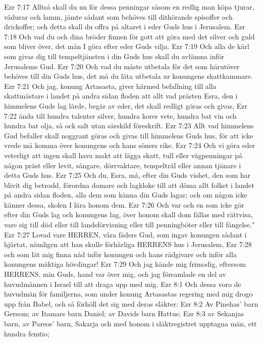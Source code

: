 Ezr 7:17  Alltså skall du nu för dessa penningar såsom en redlig man köpa tjurar, vädurar och lamm, jämte sådant som behöves till dithörande spisoffer och drickoffer; och detta skall du offra på altaret i eder Guds hus i Jerusalem.
Ezr 7:18  Och vad du och dina bröder finnen för gott att göra med det silver och guld som bliver över, det mån I göra efter eder Guds vilja.
Ezr 7:19  Och alla de kärl som givas dig till tempeltjänsten i din Guds hus skall du avlämna inför Jerusalems Gud.
Ezr 7:20  Och vad du måste utbetala för det som härutöver behöves till din Guds hus, det må du låta utbetala ur konungens skattkammare.
Ezr 7:21  Och jag, konung Artasasta, giver härmed befallning till alla skattmästare i landet på andra sidan floden att allt vad prästen Esra, den i himmelens Guds lag lärde, begär av eder, det skall redligt göras och givas,
Ezr 7:22  ända till hundra talenter silver, hundra korer vete, hundra bat vin och hundra bat olja, så ock salt utan särskild föreskrift.
Ezr 7:23  Allt vad himmelens Gud befaller skall noggrant göras och givas till himmelens Guds hus, för att icke vrede må komma över konungens och hans söners rike.
Ezr 7:24  Och vi göra eder veterligt att ingen skall hava makt att lägga skatt, tull eller vägpenningar på någon präst eller levit, sångare, dörrvaktare, tempelträl eller annan tjänare i detta Guds hus.
Ezr 7:25  Och du, Esra, må, efter din Guds vishet, den som har blivit dig betrodd, förordna domare och lagkloke till att döma allt folket i landet på andra sidan floden, alla dem som känna din Guds lagar; och om någon icke känner dessa, skolen I lära honom dem.
Ezr 7:26  Och var och en som icke gör efter din Guds lag och konungens lag, över honom skall dom fällas med rättvisa, vare sig till död eller till landsförvisning eller till penningböter eller till fängelse."
Ezr 7:27  Lovad vare HERREN, våra fäders Gud, som ingav konungen sådant i hjärtat, nämligen att han skulle förhärliga HERRENS hus i Jerusalem,
Ezr 7:28  och som lät mig finna nåd inför konungen och hans rådgivare och inför alla konungens mäktiga hövdingar!
Ezr 7:29  Och jag kände mig frimodig, eftersom HERRENS, min Guds, hand var över mig, och jag församlade en del av huvudmännen i Israel till att draga upp med mig.
Ezr 8:1  Och dessa voro de huvudmän för familjerna, som under konung Artasastas regering med mig drogo upp från Babel, och så förhöll det sig med deras släkter:
Ezr 8:2  Av Pinehas' barn Gersom; av Itamars barn Daniel; av Davids barn Hattus;
Ezr 8:3  av Sekanjas barn, av Pareos' barn, Sakarja och med honom i släktregistret upptagna män, ett hundra femtio;
